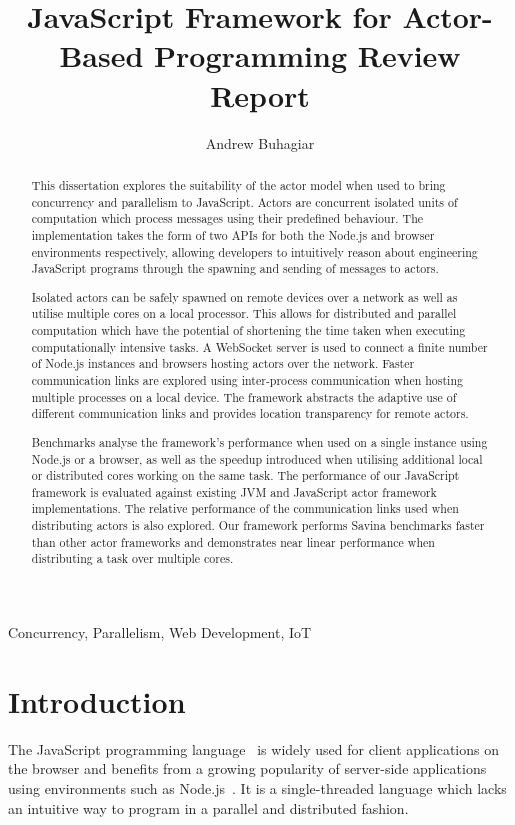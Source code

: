 \documentclass[lettersize,journal]{IEEEtran}
\begin{document}
\title{JavaScript Framework for Actor-Based Programming Review Report}
\author{Andrew Buhagiar}

\maketitle

\begin{abstract}
This dissertation explores the suitability of the actor model when used to bring concurrency and parallelism to JavaScript. Actors are concurrent isolated units of computation which process messages using their predefined behaviour. The implementation takes the form of two APIs for both the Node.js and browser environments respectively, allowing developers to intuitively reason about engineering JavaScript programs through the spawning and sending of messages to actors.

Isolated actors can be safely spawned on remote devices over a network as well as utilise multiple cores on a local processor. This allows for distributed and parallel computation which have the potential of shortening the time taken when executing computationally intensive tasks. A WebSocket server is used to connect a finite number of Node.js instances and browsers hosting actors over the network. Faster communication links are explored using inter-process communication when hosting multiple processes on a local device. The framework abstracts the adaptive use of different communication links and provides location transparency for remote actors.

Benchmarks analyse the framework's performance when used on a single instance using Node.js or a browser, as well as the speedup introduced when utilising additional local or distributed cores working on the same task. The performance of our JavaScript framework is evaluated against existing JVM and JavaScript actor framework implementations. The relative performance of the communication links used when distributing actors is also explored. Our framework performs Savina benchmarks faster than other actor frameworks and demonstrates near linear performance when distributing a task over multiple cores.
\end{abstract}

\begin{IEEEkeywords}
Concurrency, Parallelism, Web Development, IoT
\end{IEEEkeywords}

\section{Introduction}
The JavaScript programming language~\cite{ecmascript} is widely used for client applications on the browser and benefits from a growing popularity of server-side applications using environments such as Node.js~\cite{nodejs}. It is a single-threaded language which lacks an intuitive way to program in a parallel and distributed fashion. 
\end{document}
